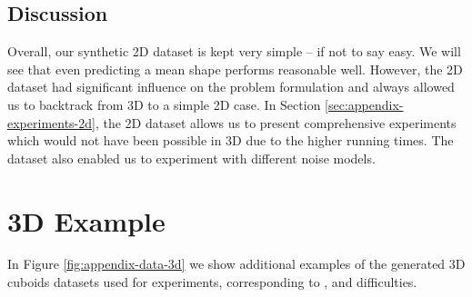 \subsection{Discussion}

Overall, our synthetic 2D dataset is kept very simple -- if not to say easy.
We will see that even predicting a mean shape performs reasonable well. However,
the 2D dataset had significant influence on the problem formulation
and always allowed us to backtrack from 3D to a simple 2D case. In Section
\ref{sec:appendix-experiments-2d}, the 2D dataset allows us to present comprehensive experiments
which would not have been possible in 3D due to the higher running times.
The dataset also enabled us to experiment with different noise models.

\FloatBarrier
\newpage
\section{3D Example}

In Figure \ref{fig:appendix-data-3d} we show additional examples of the
generated 3D cuboids datasets used for experiments, \ie corresponding to
\easy, \moderate and \hard difficulties.

